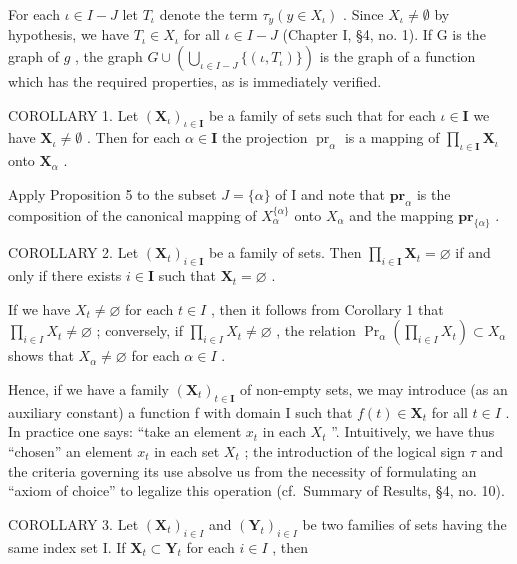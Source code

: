 For each \(\iota\in I-J\) let \(T_{\iota}\) denote the term \(\tau_{y}(y\in X_{\iota})\) . Since \(X_{\iota}\neq\emptyset\) by hypothesis, we have \(T_{\iota}\in X_{\iota}\) for all \(\iota\in I-J\) (Chapter I, §4, no. 1). If G is the graph of \(g\) , the graph \(G\cup\left(\bigcup_{\iota\in I-J}\{(\iota,T_{\iota})\}\right)\) is the graph of a function which has the required properties, as is immediately verified.

COROLLARY 1. Let \((\mathbf{X}_{\iota})_{\iota \in \mathbf{I}}\) be a family of sets such that for each \(\iota \in \mathbf{I}\) we have \(\mathbf{X}_{\iota} \neq \emptyset\) . Then for each \(\alpha \in \mathbf{I}\) the projection \(\operatorname{pr}_{\alpha}\) is a mapping of \(\prod_{\iota \in \mathbf{I}} \mathbf{X}_{\iota}\) onto \(\mathbf{X}_{\alpha}\) .

Apply Proposition 5 to the subset \(J = \{\alpha\}\) of I and note that \(\mathbf{pr}_{\alpha}\) is the composition of the canonical mapping of \(X_{\alpha}^{\{\alpha\}}\) onto \(X_{\alpha}\) and the mapping \(\mathbf{pr}_{\{\alpha\}}\) .

COROLLARY 2. Let \((\mathbf{X}_t)_{i \in \mathbf{I}}\) be a family of sets. Then \(\prod_{i \in \mathbf{I}} \mathbf{X}_t = \varnothing\) if and only if there exists \(i \in \mathbf{I}\) such that \(\mathbf{X}_t = \varnothing\) .

If we have \(X_{t} \neq \varnothing\) for each \(t \in I\) , then it follows from Corollary 1 that \(\prod_{i \in I} X_{t} \neq \varnothing\) ; conversely, if \(\prod_{i \in I} X_{t} \neq \varnothing\) , the relation \(\Pr_{\alpha}\left(\prod_{i \in I} X_{t}\right) \subset X_{\alpha}\) shows that \(X_{\alpha} \neq \varnothing\) for each \(\alpha \in I\) .

Hence, if we have a family \((\mathbf{X}_{t})_{t\in\mathbf{I}}\) of non-empty sets, we may introduce (as an auxiliary constant) a function f with domain I such that \(f(t)\in\mathbf{X}_{t}\) for all \(t\in I\) . In practice one says: ``take an element \(x_{t}\) in each \(X_{t}\) ''. Intuitively, we have thus ``chosen'' an element \(x_{t}\) in each set \(X_{t}\) ; the introduction of the logical sign \(\tau\) and the criteria governing its use absolve us from the necessity of formulating an ``axiom of choice'' to legalize this operation (cf.~Summary of Results, §4, no. 10).

COROLLARY 3. Let \((\mathbf{X}_t)_{i\in I}\) and \((\mathbf{Y}_t)_{i\in I}\) be two families of sets having the same index set I. If \(\mathbf{X}_t\subset \mathbf{Y}_t\) for each \(i\in I\) , then

